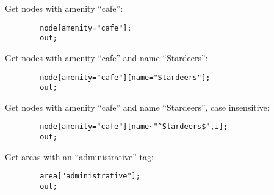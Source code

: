 \documentclass[main.tex]{subfiles}
\begin{document}
\begin{example}
    Get nodes with amenity ``cafe'':
    \begin{lstlisting}
        node[amenity="cafe"];
        out;
    \end{lstlisting}
    
    Get nodes with amenity ``cafe'' and name ``Stardeers'':
    \begin{lstlisting}
        node[amenity="cafe"][name="Stardeers"];
        out;
    \end{lstlisting}

    Get nodes with amenity ``cafe'' and name ``Stardeers'', case insensitive:
    \begin{lstlisting}
        node[amenity="cafe"][name~"^Stardeers$",i];
        out;
    \end{lstlisting}

    Get areas with an ``administrative'' tag:
    \begin{lstlisting}
        area["administrative"];
        out;
    \end{lstlisting}
\end{example}
\end{document}
